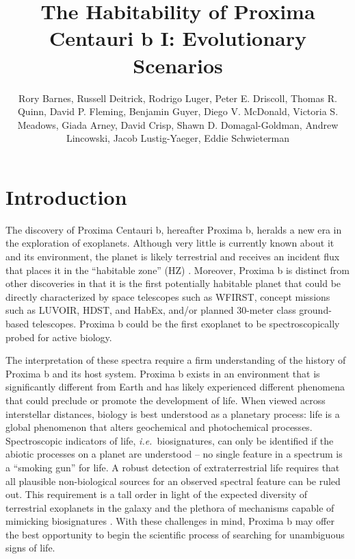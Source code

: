 \documentclass[preprint,12pt]{aastex}
\def\ie{{\it i.e.\ }}
\begin{document}
\title{The Habitability of Proxima Centauri b I: Evolutionary Scenarios}
\author{Rory Barnes, Russell Deitrick, Rodrigo Luger, Peter E. Driscoll, Thomas R. Quinn, David P. Fleming, Benjamin Guyer, Diego V. McDonald, Victoria S. Meadows, Giada Arney, David Crisp, Shawn D. Domagal-Goldman, Andrew Lincowski, Jacob Lustig-Yaeger, Eddie Schwieterman}

\begin{abstract}
\end{abstract}

\section{Introduction\label{sec:intro}}

The discovery of Proxima Centauri b, hereafter Proxima b, heralds a
new era in the exploration of exoplanets. Although very little is
currently known about it and its environment, the planet is likely
terrestrial and receives an incident flux that places it in the
``habitable zone'' (HZ)
\citep{Kasting93,Selsis07,Kopparapu13}. Moreover, Proxima b is
distinct from other discoveries in that it is the first potentially
habitable planet that could be directly characterized by space
telescopes such as WFIRST, concept missions such as LUVOIR, HDST, and
HabEx, and/or planned 30-meter class ground-based telescopes. Proxima
b could be the first exoplanet to be spectroscopically probed for
active biology.

The interpretation of these spectra require a firm understanding of
the history of Proxima b and its host system. Proxima b exists in an
environment that is significantly different from Earth and has likely
experienced different phenomena that could preclude or promote the
development of life. When viewed across interstellar distances,
biology is best understood as a planetary process: life is a global
phenomenon that alters geochemical and photochemical
processes. Spectroscopic indicators of life, \ie biosignatures, can
only be identified if the abiotic processes on a planet are understood
-- no single feature in a spectrum is a ``smoking gun'' for life. A
robust detection of extraterrestrial life requires that all plausible
non-biological sources for an observed spectral feature can be ruled
out. This requirement is a tall order in light of the expected
diversity of terrestrial exoplanets in the galaxy and the plethora of
mechanisms capable of mimicking biosignatures
\citep{Schwieterman16,Meadows16}.  With these challenges in mind,
Proxima b may offer the best opportunity to begin the scientific
process of searching for unambiguous signs of life.
\end{document}

